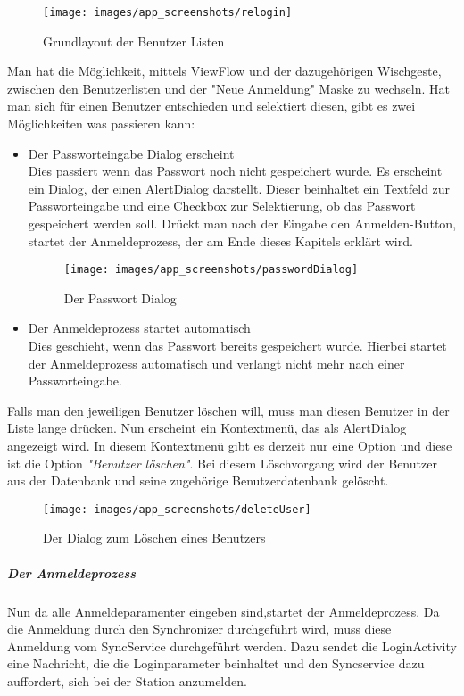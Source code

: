 \begin{figure}[H]
\centering
\texttt{[image: images/app\_screenshots/relogin]}
\caption{Grundlayout der Benutzer Listen}
\end{figure}

Man hat die Möglichkeit, mittels ViewFlow und der dazugehörigen Wischgeste,  zwischen den Benutzerlisten und der "Neue Anmeldung" Maske zu wechseln. 
Hat man sich für einen Benutzer entschieden und selektiert diesen, gibt es zwei Möglichkeiten was passieren kann:

\begin{itemize}
\item{Der Passworteingabe Dialog erscheint}\\
Dies passiert wenn das Passwort noch nicht gespeichert wurde. Es erscheint ein Dialog, der einen AlertDialog darstellt. Dieser beinhaltet ein Textfeld zur Passworteingabe und eine Checkbox zur Selektierung, ob das Passwort gespeichert werden soll.
Drückt man nach der Eingabe den Anmelden-Button, startet der Anmeldeprozess, der am Ende dieses Kapitels erklärt wird.
\begin{figure}[H]
\centering
\texttt{[image: images/app\_screenshots/passwordDialog]}
\caption{Der Passwort Dialog}
\end{figure}

\item{Der Anmeldeprozess startet automatisch}\\
Dies geschieht, wenn das Passwort bereits gespeichert wurde. Hierbei startet der Anmeldeprozess automatisch und verlangt nicht mehr nach einer Passworteingabe.

\end{itemize}

Falls man den jeweiligen Benutzer löschen will, muss man diesen Benutzer in der Liste lange drücken. Nun erscheint ein Kontextmenü, das als AlertDialog angezeigt wird. In diesem Kontextmenü gibt es derzeit nur eine Option und diese ist die Option \textit{"Benutzer löschen"}.
Bei diesem Löschvorgang wird der Benutzer aus der Datenbank und seine zugehörige Benutzerdatenbank gelöscht.

\begin{figure}[H]
\centering
\texttt{[image: images/app\_screenshots/deleteUser]}
\caption{Der Dialog zum Löschen eines Benutzers}
\end{figure}

\subparagraph{Der Anmeldeprozess}
Nun da alle Anmeldeparamenter eingeben sind,startet der Anmeldeprozess. Da die Anmeldung durch den Synchronizer durchgeführt wird, muss diese Anmeldung vom SyncService durchgeführt werden. Dazu sendet die LoginActivity eine Nachricht, die die Loginparameter beinhaltet und den Syncservice dazu auffordert, sich bei der Station anzumelden.


